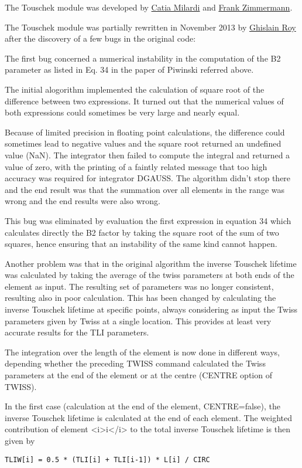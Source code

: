 The \madx Touschek module was developed by
\href{mailto:catia.milardi@lnf.infn.it}{Catia Milardi} and 
\href{mailto:frank.zimmermann@cern.ch}{Frank Zimmermann}.

The \madx Touschek module was partially rewritten in November 2013 by
\href{mailto:ghislain.roy@cern.ch}{Ghislain Roy}  
after the discovery of a few bugs in the original code:

The first bug concerned a numerical instability in the computation of
the B2 parameter as listed in Eq. 34 in the paper of Piwinski referred
above.  

The initial alogorithm implemented the calculation of square root of the
difference between two expressions. It turned out that the numerical
values of both expressions could sometimes be very large and nearly
equal.
  
Because of limited precision in floating point calculations, the
difference could sometimes lead to negative values  
and the square root returned an undefined value (NaN). 
The integrator then failed to compute the integral and returned a value
of zero, with the printing of a faintly related  
message that too high accuracy was required for integrator DGAUSS. 
The algorithm didn't stop there and the end result was that the
summation over all elements in the range was wrong 
and the end results were also wrong.

This bug was eliminated by evaluation the first expression in equation
34 which calculates directly the B2 factor by taking the square root of
the sum of two squares, hence ensuring that an instability of the same
kind cannot happen.  

Another problem was that in the original algorithm the inverse Touschek
lifetime was calculated by taking the average of the twiss parameters at
both ends of the element as input. The resulting set of parameters was
no longer consistent, resulting also in poor calculation. This has been
changed by calculating the inverse Touschek lifetime at specific points,  
always considering as input the Twiss parameters given by Twiss at a
single location. This provides at least very accurate results for the
TLI parameters. 

The integration over the length of the element is now done in different
ways, depending whether the preceding TWISS command calculated the Twiss
parameters at the end of the element or at the centre (CENTRE option of
TWISS).  

In the first case (calculation at the end of the element, CENTRE=false), 
the inverse Touschek lifetime is calculated at the end of each element. 
The weighted contribution of element <i>i</i> to the total inverse
Touschek lifetime is then given by 
\begin{verbatim}
TLIW[i] = 0.5 * (TLI[i] + TLI[i-1]) * L[i] / CIRC
\end{verbatim}

